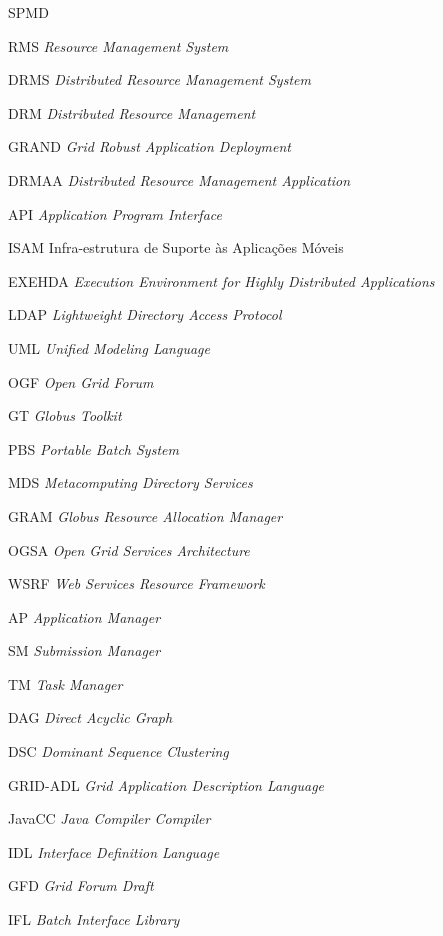 
\tableofcontents


\begin{listofabbrv}{SPMD}
        \item[RMS]   \emph{Resource Management System}
        \item[DRMS]  \emph{Distributed Resource Management System}
        \item[DRM]   \emph{Distributed Resource Management}
        \item[GRAND] \emph{Grid Robust Application Deployment}
        \item[DRMAA] \emph{Distributed Resource Management Application}
        \item[API]   \emph{Application Program Interface}
        \item[ISAM]  Infra-estrutura de Suporte às Aplicações Móveis
        \item[EXEHDA]\emph{Execution Environment for Highly Distributed Applications}
        \item[LDAP]  \emph{Lightweight Directory Access Protocol}
        \item[UML]   \emph{Unified Modeling Language}
        \item[OGF]   \emph{Open Grid Forum}
        \item[GT]    \emph{Globus Toolkit}
        \item[PBS]   \emph{Portable Batch System}
        \item[MDS]   \emph{Metacomputing Directory Services}
        \item[GRAM]  \emph{Globus Resource Allocation Manager}
        \item[OGSA]  \emph{Open Grid Services Architecture}
        \item[WSRF]  \emph{Web Services Resource Framework}
        \item[AP]    \emph{Application Manager}
        \item[SM]    \emph{Submission Manager}
        \item[TM]    \emph{Task Manager}
        \item[DAG]	\emph{Direct Acyclic Graph}
        \item[DSC]	\emph{Dominant Sequence Clustering}
        \item[GRID-ADL] \emph{Grid Application Description Language}
        \item[JavaCC]\emph{Java Compiler Compiler}
        \item[IDL]	\emph{Interface Definition Language}
        \item[GFD]   \emph{Grid Forum Draft}
        \item[IFL]   \emph{Batch Interface Library}
\end{listofabbrv}


\listoffigures

\listoftables

